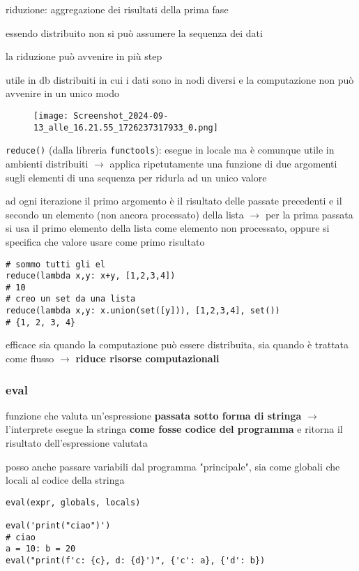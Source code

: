 riduzione: aggregazione dei risultati della prima fase

essendo distribuito non si pu\`o assumere la sequenza dei dati

la riduzione pu\`o avvenire in pi\`u step

utile in db distribuiti in cui i dati sono in nodi diversi e la computazione non pu\`o avvenire in un unico modo

\begin{figure}[h]
\centering
\texttt{[image: Screenshot\_2024-09-13\_alle\_16.21.55\_1726237317933\_0.png]}
\end{figure}

\texttt{reduce()} (dalla libreria \texttt{functools}): esegue in locale ma \`e comunque utile in ambienti distribuiti $\rightarrow$ applica ripetutamente una funzione di due argomenti sugli elementi di una sequenza per ridurla ad un unico valore

ad ogni iterazione il primo argomento \`e il risultato delle passate precedenti e il secondo un elemento (non ancora processato) della lista $\rightarrow$ per la prima passata si usa il primo elemento della lista come elemento non processato, oppure si specifica che valore usare come primo risultato

\begin{verbatim}
# sommo tutti gli el
reduce(lambda x,y: x+y, [1,2,3,4])
# 10
# creo un set da una lista
reduce(lambda x,y: x.union(set([y])), [1,2,3,4], set())
# {1, 2, 3, 4}
\end{verbatim}

efficace sia quando la computazione pu\`o essere distribuita, sia quando \`e trattata come flusso $\rightarrow$ \textbf{riduce risorse computazionali}

\subsubsection{eval}

funzione che valuta un'espressione \textbf{passata sotto forma di stringa} $\rightarrow$ l'interprete esegue la stringa \textbf{come fosse codice del programma} e ritorna il risultato dell'espressione valutata

posso anche passare variabili dal programma "principale", sia come globali che locali al codice della stringa

\begin{verbatim}
eval(expr, globals, locals)

eval('print("ciao")')
# ciao
a = 10: b = 20
eval("print(f'c: {c}, d: {d}')", {'c': a}, {'d': b})
\end{verbatim}

